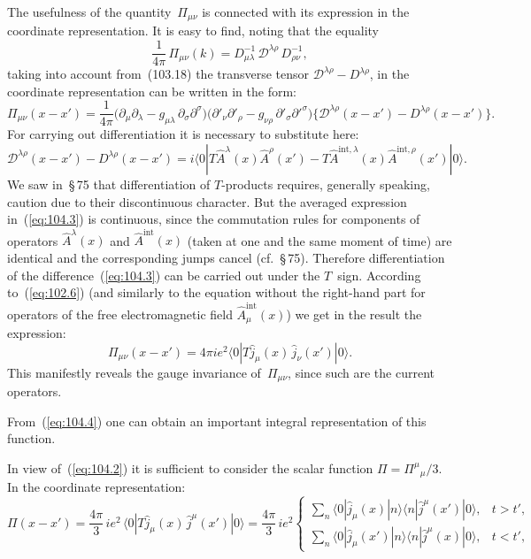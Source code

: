 The usefulness of the quantity~$\Pi_{\mu\nu}$ is connected with its expression in the coordinate representation. It is easy to find, noting that the equality
\[
\frac{1}{4\pi}\,\Pi_{\mu\nu}(k) = D^{-1}_{\mu\lambda}\,\mathcal{D}^{\lambda\rho}\,D^{-1}_{\rho\nu},
\]
taking into account from~(103.18) the transverse tensor $\mathcal{D}^{\lambda\rho} - D^{\lambda\rho}$, in the coordinate representation can be written in the form:
\[
\Pi_{\mu\nu}(x - x') = \frac{1}{4\pi}\bigl(\partial_\mu\partial_\lambda - g_{\mu\lambda}\,\partial_\sigma\partial^\sigma\bigr)\bigl(\partial'_\nu\partial'_\rho - g_{\nu\rho}\,\partial'_\sigma\partial'^\sigma\bigr)\bigl\{\mathcal{D}^{\lambda\rho}(x - x') - D^{\lambda\rho}(x - x')\bigr\}.
\]
For carrying out differentiation it is necessary to substitute here:
\begin{equation}
\mathcal{D}^{\lambda\rho}(x - x') - D^{\lambda\rho}(x - x') = i\langle 0|T\hat{A}^\lambda(x)\hat{A}^\rho(x') - T\hat{A}^{\mathrm{int},\lambda}(x)\hat{A}^{\mathrm{int},\rho}(x')|0\rangle.
\label{eq:104.3}
\end{equation}
We saw in~\S\,75 that differentiation of $T$-products requires, generally speaking, caution due to their discontinuous character. But the averaged expression in~(\ref{eq:104.3}) is continuous, since the commutation rules for components of operators $\hat{A}^\lambda(x)$ and $\hat{A}^{\mathrm{int}}(x)$ (taken at one and the same moment of time) are identical and the corresponding jumps cancel (cf.~\S\,75). Therefore differentiation of the difference~(\ref{eq:104.3}) can be carried out under the $T$~sign. According to~(\ref{eq:102.6}) (and similarly to the equation without the right-hand part for operators of the free electromagnetic field $\hat{A}^{\mathrm{int}}_\mu(x)$) we get in the result the expression:
\begin{equation}
\Pi_{\mu\nu}(x - x') = 4\pi i e^2\langle 0|T\hat{j}_\mu(x)\,\hat{j}_\nu(x')|0\rangle.
\label{eq:104.4}
\end{equation}
This manifestly reveals the gauge invariance of~$\Pi_{\mu\nu}$, since such are the current operators.

From~(\ref{eq:104.4}) one can obtain an important integral representation of this function.

In view of~(\ref{eq:104.2}) it is sufficient to consider the scalar function $\Pi = \Pi^\mu{}_\mu/3$. In the coordinate representation:
\begin{equation}
\Pi(x - x') = \frac{4\pi}{3}\,ie^2\,\langle 0|T\hat{j}_\mu(x)\,\hat{j}^\mu(x')|0\rangle = \frac{4\pi}{3}\,ie^2 \begin{cases} \displaystyle\sum_n \langle 0|\hat{j}_\mu(x)|n\rangle\langle n|\hat{j}^\mu(x')|0\rangle, & t > t', \\[6pt] \displaystyle\sum_n \langle 0|\hat{j}_\mu(x')|n\rangle\langle n|\hat{j}^\mu(x)|0\rangle, & t < t',
\end{cases}
\label{eq:104.5}
\end{equation}

